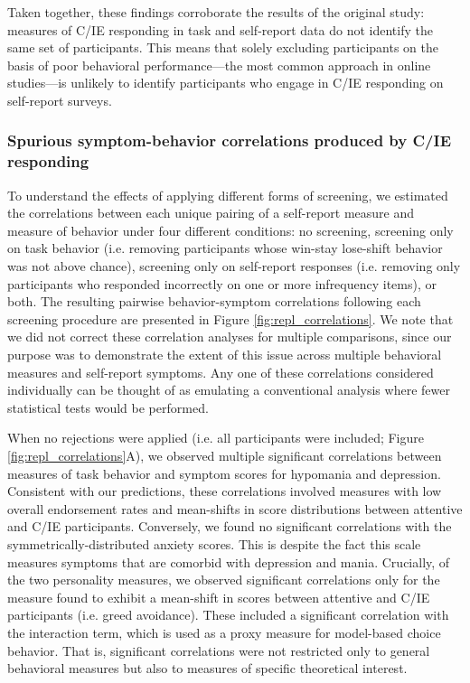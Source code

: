 \documentclass[a4paper,notitlepage,12pt]{article}
\begin{document}
\begin{refsection}[supp]
Taken together, these findings corroborate the results of the original study: measures of C/IE responding in task and self-report data do not identify the same set of participants. This means that solely excluding participants on the basis of poor behavioral performance---the most common approach in online studies---is unlikely to identify participants who engage in C/IE responding on self-report surveys. 

\subsubsection*{Spurious symptom-behavior correlations produced by C/IE responding}

To understand the effects of applying different forms of screening, we estimated the correlations between each unique pairing of a self-report measure and measure of behavior under four different conditions: no screening, screening only on task behavior (i.e. removing participants whose win-stay lose-shift behavior was not above chance), screening only on self-report responses (i.e. removing only participants who responded incorrectly on one or more infrequency items), or both. The resulting pairwise behavior-symptom correlations following each screening procedure are presented in Figure \ref{fig:repl_correlations}. We note that we did not correct these correlation analyses for multiple comparisons, since our purpose was to demonstrate the extent of this issue across multiple behavioral measures and self-report symptoms. Any one of these correlations considered individually can be thought of as emulating a conventional analysis where fewer statistical tests would be performed.

When no rejections were applied (i.e. all participants were included; Figure \ref{fig:repl_correlations}A), we observed multiple significant correlations between measures of task behavior and symptom scores for hypomania and depression. Consistent with our predictions, these correlations involved measures with low overall endorsement rates and mean-shifts in score distributions between attentive and C/IE participants. Conversely, we found no significant correlations with the symmetrically-distributed anxiety scores. This is despite the fact this scale measures symptoms that are comorbid with depression and mania. Crucially, of the two personality measures, we observed significant correlations only for the measure found to exhibit a mean-shift in scores between attentive and C/IE participants (i.e. greed avoidance). These included a significant correlation with the interaction term, which is used as a proxy measure for model-based choice behavior. That is, significant correlations were not restricted only to general behavioral measures but also to measures of specific theoretical interest.


\end{refsection}
\end{document}
